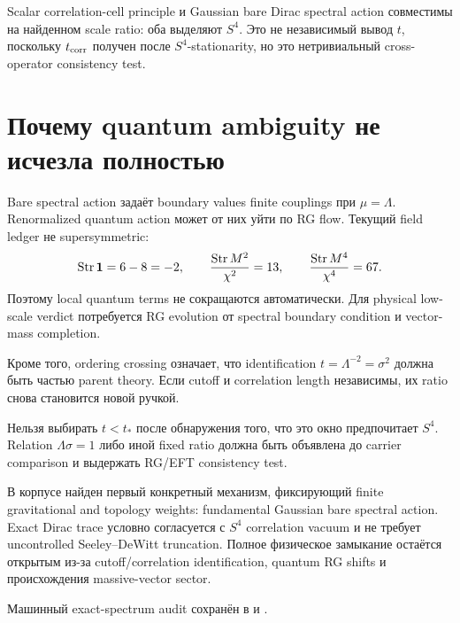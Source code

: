 \begin{proposition}
Scalar correlation-cell principle и Gaussian bare Dirac spectral action
совместимы на найденном scale ratio: оба выделяют \(S^4\). Это не
независимый вывод \(t\), поскольку \(t_{\rm corr}\) получен после
\(S^4\)-stationarity, но это нетривиальный cross-operator consistency test.
\end{proposition}

\section{Почему quantum ambiguity не исчезла полностью}

Bare spectral action задаёт boundary values finite couplings при
\(\mu=\Lambda\). Renormalized quantum action может от них уйти по RG flow.
Текущий field ledger не supersymmetric:
\begin{equation}
 \operatorname{Str}\mathbf1=6-8=-2,
 \qquad
 \frac{\operatorname{Str} M^2}{\chi^2}=13,
 \qquad
 \frac{\operatorname{Str} M^4}{\chi^4}=67.
\end{equation}
Поэтому local quantum terms не сокращаются автоматически. Для physical
low-scale verdict потребуется RG evolution от spectral boundary condition и
vector-mass completion.

Кроме того, ordering crossing означает, что identification
\(t=\Lambda^{-2}=\sigma^2\) должна быть частью parent theory. Если cutoff и
correlation length независимы, их ratio снова становится новой ручкой.

\begin{nogocriterion}
Нельзя выбирать \(t<t_*\) после обнаружения того, что это окно предпочитает
\(S^4\). Relation \(\Lambda\sigma=1\) либо иной fixed ratio должна быть
объявлена до carrier comparison и выдержать RG/EFT consistency test.
\end{nogocriterion}

\begin{theorem}
В корпусе найден первый конкретный механизм, фиксирующий finite
gravitational and topology weights: fundamental Gaussian bare spectral
action. Exact Dirac trace условно согласуется с \(S^4\) correlation vacuum
и не требует uncontrolled Seeley--DeWitt truncation. Полное физическое
замыкание остаётся открытым из-за cutoff/correlation identification,
quantum RG shifts и происхождения massive-vector sector.
\end{theorem}

Машинный exact-spectrum audit сохранён в
 и
.